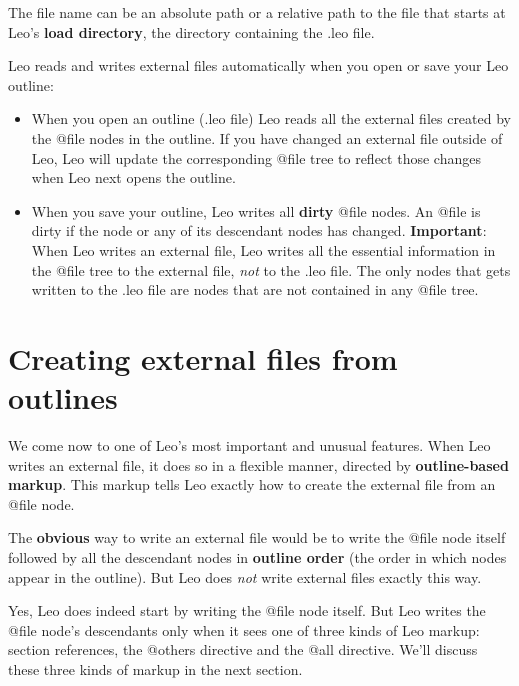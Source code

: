 \documentclass[a4paper,10pt,english]{sphinxmanual}
\begin{document}
The file name can be an absolute path or a relative path to the file that starts
at Leo's \textbf{load directory}, the directory containing the .leo file.

Leo reads and writes external files automatically when you open or save your Leo
outline:
\begin{itemize}
\item {} 
When you open an outline (.leo file) Leo reads all the external files created
by the @file nodes in the outline. If you have changed an external file
outside of Leo, Leo will update the corresponding @file tree to reflect those
changes when Leo next opens the outline.

\end{itemize}

\begin{itemize}
\item {} 
When you save your outline, Leo writes all \textbf{dirty} @file nodes. An @file
is dirty if the node or any of its descendant nodes has changed.
\textbf{Important}: When Leo writes an external file, Leo writes all the essential
information in the @file tree to the external file, \emph{not} to the .leo file.
The only nodes that gets written to the .leo file are nodes that are not
contained in any @file tree.

\end{itemize}


\section{Creating external files from outlines}
\label{intro:creating-external-files-from-outlines}
We come now to one of Leo's most important and unusual features. When Leo writes
an external file, it does so in a flexible manner, directed by \textbf{outline-based
markup}. This markup tells Leo exactly how to create the external file from an
@file node.

The \textbf{obvious} way to write an external file would be to write the @file node
itself followed by all the descendant nodes in \textbf{outline order} (the order in
which nodes appear in the outline). But Leo does \emph{not} write external files
exactly this way.

Yes, Leo does indeed start by writing the @file node itself. But Leo writes the
@file node's descendants only when it sees one of three kinds of Leo
markup: section references, the @others directive and the @all directive.
We'll discuss these three kinds of markup in the next section.
\end{document}
